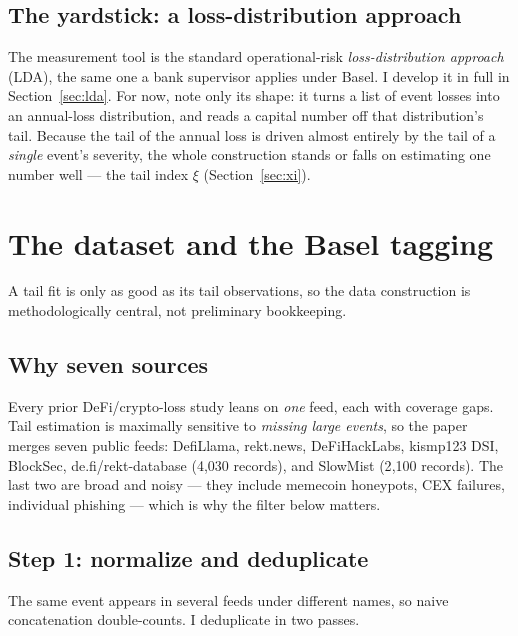 \documentclass[11pt]{article}
\theoremstyle{definition}
\theoremstyle{remark}
\theoremstyle{definition}
\newcommand{\1}{\mathbf{1}}
\begin{document}
\subsection{The yardstick: a loss-distribution approach}

The measurement tool is the standard operational-risk \emph{loss-distribution
approach} (LDA), the same one a bank supervisor applies under Basel. I develop
it in full in Section~\ref{sec:lda}. For now, note only its shape: it turns a list of
event losses into an annual-loss distribution, and reads a capital number off
that distribution's tail. Because the tail of the annual loss is driven almost
entirely by the tail of a \emph{single} event's severity, the whole
construction stands or falls on estimating one number well --- the tail index
$\xi$ (Section~\ref{sec:xi}).

\section{The dataset and the Basel tagging}\label{sec:data}

A tail fit is only as good as its tail observations, so the data construction
is methodologically central, not preliminary bookkeeping.

\subsection{Why seven sources}

Every prior DeFi/crypto-loss study leans on \emph{one} feed, each with coverage
gaps. Tail estimation is maximally sensitive to \emph{missing large events}, so
the paper merges seven public feeds: DefiLlama, rekt.news, DeFiHackLabs,
kismp123 DSI, BlockSec, de.fi/rekt-database (4{,}030 records), and SlowMist
(2{,}100 records). The last two are broad and noisy --- they include memecoin
honeypots, CEX failures, individual phishing --- which is why the filter below
matters.

\subsection{Step 1: normalize and deduplicate}

The same event appears in several feeds under different names, so naive
concatenation double-counts. I deduplicate in two passes.
\end{document}
